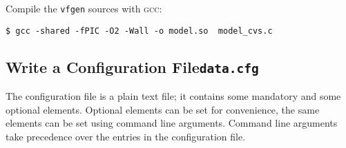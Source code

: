 \documentclass[english,12pt]{scrartcl}
\begin{document}
Compile the \texttt{vfgen} sources with \textsc{gcc}:
\begin{verbatim}
$ gcc -shared -fPIC -O2 -Wall -o model.so  model_cvs.c
\end{verbatim}

\subsection[write a configuration/data file]{Write a Configuration File\hfill\texttt{data.cfg}}
\label{sec:configuration}

The configuration file is a plain text file; it contains some
mandatory and some optional elements. Optional elements can be set for
convenience, the same elements can be set using command line
arguments. Command line arguments take precedence over the entries in
the configuration file.
\end{document}
